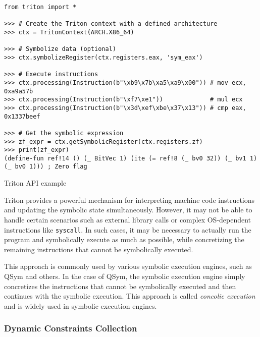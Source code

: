 \begin{listing}[htp]
	\centering
	\begin{minipage}{.9\linewidth}
		\begin{verbatim}
from triton import *

>>> # Create the Triton context with a defined architecture
>>> ctx = TritonContext(ARCH.X86_64)

>>> # Symbolize data (optional)
>>> ctx.symbolizeRegister(ctx.registers.eax, 'sym_eax')

>>> # Execute instructions
>>> ctx.processing(Instruction(b"\xb9\x7b\xa5\xa9\x00")) # mov ecx, 0xa9a57b
>>> ctx.processing(Instruction(b"\xf7\xe1"))             # mul ecx
>>> ctx.processing(Instruction(b"\x3d\xef\xbe\x37\x13")) # cmp eax, 0x1337beef

>>> # Get the symbolic expression
>>> zf_expr = ctx.getSymbolicRegister(ctx.registers.zf)
>>> print(zf_expr)
(define-fun ref!14 () (_ BitVec 1) (ite (= ref!8 (_ bv0 32)) (_ bv1 1) (_ bv0 1))) ; Zero flag
	\end{verbatim}
	\end{minipage}
	\caption{Triton API example}
	\label{lst:example4}
\end{listing}

Triton provides a powerful mechanism for interpreting machine code instructions and updating the symbolic state simultaneously. However, it may not be able to handle certain scenarios such as external library calls or complex OS-dependent instructions like \texttt{syscall}. In such cases, it may be necessary to actually run the program and symbolically execute as much as possible, while concretizing the remaining instructions that cannot be symbolically executed.

This approach is commonly used by various symbolic execution engines, such as QSym \cite{qsym-usenix2018} and others. In the case of QSym, the symbolic execution engine simply concretizes the instructions that cannot be symbolically executed and then continues with the symbolic execution. This approach is called \textit{concolic execution} and is widely used in symbolic execution engines.


\subsubsection{Dynamic Constraints Collection}

